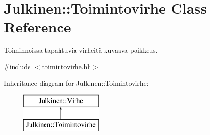 \hypertarget{class_julkinen_1_1_toimintovirhe}{}\section{Julkinen\+:\+:Toimintovirhe Class Reference}
\label{class_julkinen_1_1_toimintovirhe}


Toiminnoissa tapahtuvia virheitä kuvaava poikkeus.  




{\ttfamily \#include $<$toimintovirhe.\+hh$>$}

Inheritance diagram for Julkinen\+:\+:Toimintovirhe\+:\begin{figure}[H]
\begin{center}
\leavevmode
\includegraphics[height=2.000000cm]{class_julkinen_1_1_toimintovirhe}
\end{center}
\end{figure}
